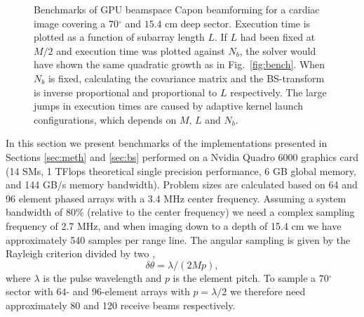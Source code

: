 \documentclass[journal]{IEEEtran}
\newcommand{\degree}{\ensuremath{^\circ}}
\begin{document}
\begin{figure}[!t]
\centerline{
\hfil
{}}
\caption{Benchmarks of GPU beamspace Capon beamforming for a cardiac image covering a $70 \degree$ and $15.4$ cm deep sector. Execution time is plotted as a function of subarray length $L$.  If $L$ had been fixed at $M/2$ and execution time was plotted against $N_b$, the solver would have shown the same quadratic growth as in Fig.\ \ref{fig:bench}. When $N_b$ is fixed, calculating the covariance matrix and the BS-transform is inverse proportional and proportional to $L$ respectively. The large jumps in execution times are caused by adaptive kernel launch configurations, which depends on $M$, $L$ and $N_b$.}
\label{fig:benchBS}
\end{figure}
In this section we present benchmarks of the implementations presented in Sections \ref{sec:meth} and \ref{sec:bs} performed on a Nvidia Quadro 6000 graphics card (14 SMs, 1 TFlops theoretical single precision performance, 6 GB global memory, and 144 GB/s memory bandwidth). Problem sizes are calculated based on 64 and 96 element phased arrays with a 3.4 MHz center frequency. Assuming a system bandwidth of 80\% (relative to the center frequency) we need a complex sampling frequency of 2.7 MHz, and when imaging down to a depth of 15.4 cm we have approximately 540 samples per range line. The angular sampling is given by the Rayleigh criterion divided by two \cite{Hergum2007}, 
\begin{equation}\label{eq:rayleigh}
\delta{}\theta = \lambda/(2Mp),
\end{equation}
where $\lambda$ is the pulse wavelength and $p$ is the element pitch. 
To sample a $70\degree$ sector with $64$- and $96$-element arrays with $p=\lambda/2$ we therefore need approximately 80 and 120 receive beams respectively. 
\end{document}
